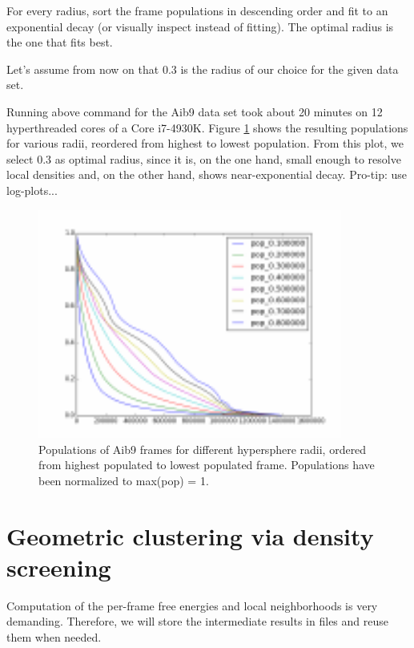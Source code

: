 \documentclass[12pt,a4paper,twoside,english,fleqn]{article}
\begin{document}
For every radius, sort the frame populations in descending order and fit to an
exponential decay (or visually inspect instead of fitting).
The optimal radius is the one that fits best.

Let's assume from now on that 0.3 is the radius of our choice for the given
data set.

\begin{mdframed}[innertopmargin=20pt]
  Running above command for the Aib9 data set took about 20 minutes on
  12 hyperthreaded cores of a Core i7-4930K.
  Figure \ref{fig:pops_ordered} shows the resulting populations for various
  radii, reordered from highest to lowest population.
  From this plot, we select 0.3 as optimal radius, since it is, on the one
  hand, small enough to resolve local densities and, on the other hand, shows
  near-exponential decay. Pro-tip: use log-plots...
\end{mdframed}


\begin{figure}
  \centerline{
    \includegraphics[width=10cm] {pops_ordered}}
  \caption{\label{fig:pops_ordered}
      Populations of Aib9 frames for different hypersphere radii,
      ordered from highest populated to lowest populated frame.
      Populations have been normalized to max(pop) = 1.}
\end{figure}



\section{Geometric clustering via density screening}
Computation of the per-frame free energies and local neighborhoods is very
demanding. Therefore, we will store the intermediate results in files and reuse
them when needed.
\end{document}
